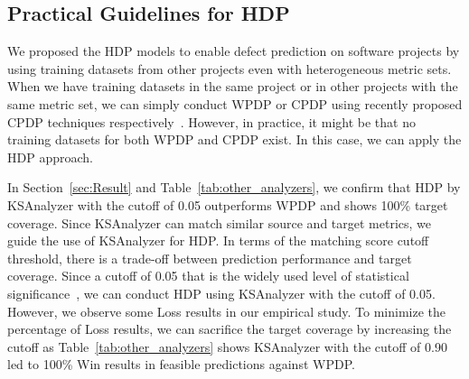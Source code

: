 % 
% 






\subsection{Practical Guidelines for HDP}

We proposed the HDP models to enable defect prediction on software projects
by using training datasets from other projects even with heterogeneous metric sets.
When we have training datasets in the same project or in other
projects with the same metric set, we can simply conduct
WPDP or CPDP using recently proposed CPDP techniques
respectively~\cite{Canfora13,Ma12,Nam13,Panichella14,Ryu14,Ryu15}.
However, in practice, it might be that no training datasets for
both WPDP and CPDP exist. In this case, we can apply the HDP approach.

In Section~\ref{sec:Result} and Table~\ref{tab:other_analyzers}, we confirm
that HDP by KSAnalyzer with the cutoff of 0.05
outperforms WPDP and shows 100\% target coverage.
Since KSAnalyzer can match similar source and target metrics, we guide the use
of KSAnalyzer for HDP. In terms of the matching score cutoff threshold, there is a
trade-off between prediction performance and target coverage. Since a cutoff
of 0.05 that is the widely used level of statistical
significance~\cite{Corder09}, we can conduct HDP using KSAnalyzer with the
cutoff of 0.05. However, we observe some Loss results in our empirical study.
To minimize the percentage of Loss results, we can sacrifice the target coverage
by increasing the cutoff as Table~\ref{tab:other_analyzers} shows KSAnalyzer with
the cutoff of 0.90 led to 100\% Win results in feasible predictions against
WPDP.

